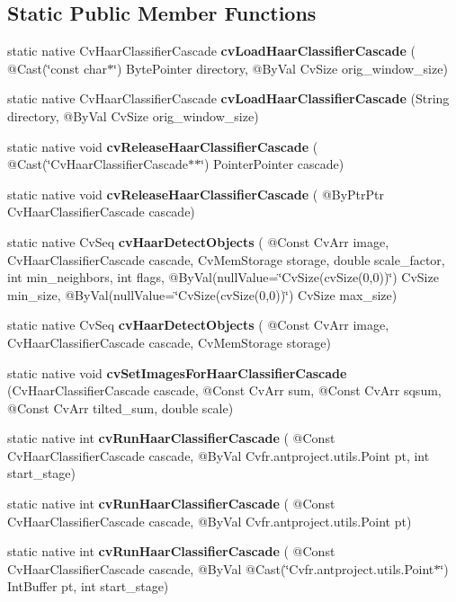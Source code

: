 \subsection*{Static Public Member Functions}
\begin{DoxyCompactItemize}
\item 
static native Cv\+Haar\+Classifier\+Cascade {\bfseries cv\+Load\+Haar\+Classifier\+Cascade} ( @Cast(\char`\"{}const char$\ast$\char`\"{}) Byte\+Pointer directory, @By\+Val Cv\+Size orig\+\_\+window\+\_\+size)
\item 
static native Cv\+Haar\+Classifier\+Cascade {\bfseries cv\+Load\+Haar\+Classifier\+Cascade} (String directory, @By\+Val Cv\+Size orig\+\_\+window\+\_\+size)
\item 
static native void {\bfseries cv\+Release\+Haar\+Classifier\+Cascade} ( @Cast(\char`\"{}Cv\+Haar\+Classifier\+Cascade$\ast$$\ast$\char`\"{}) Pointer\+Pointer cascade)
\item 
static native void {\bfseries cv\+Release\+Haar\+Classifier\+Cascade} ( @By\+Ptr\+Ptr Cv\+Haar\+Classifier\+Cascade cascade)
\item 
static native Cv\+Seq {\bfseries cv\+Haar\+Detect\+Objects} ( @Const Cv\+Arr image, Cv\+Haar\+Classifier\+Cascade cascade, Cv\+Mem\+Storage storage, double scale\+\_\+factor, int min\+\_\+neighbors, int flags, @By\+Val(null\+Value=\char`\"{}Cv\+Size(cv\+Size(0,0))\char`\"{}) Cv\+Size min\+\_\+size, @By\+Val(null\+Value=\char`\"{}Cv\+Size(cv\+Size(0,0))\char`\"{}) Cv\+Size max\+\_\+size)
\item 
static native Cv\+Seq {\bfseries cv\+Haar\+Detect\+Objects} ( @Const Cv\+Arr image, Cv\+Haar\+Classifier\+Cascade cascade, Cv\+Mem\+Storage storage)
\item 
static native void {\bfseries cv\+Set\+Images\+For\+Haar\+Classifier\+Cascade} (Cv\+Haar\+Classifier\+Cascade cascade, @Const Cv\+Arr sum, @Const Cv\+Arr sqsum, @Const Cv\+Arr tilted\+\_\+sum, double scale)
\item 
static native int {\bfseries cv\+Run\+Haar\+Classifier\+Cascade} ( @Const Cv\+Haar\+Classifier\+Cascade cascade, @By\+Val Cv\+fr.antproject.utils.Point pt, int start\+\_\+stage)
\item 
static native int {\bfseries cv\+Run\+Haar\+Classifier\+Cascade} ( @Const Cv\+Haar\+Classifier\+Cascade cascade, @By\+Val Cv\+fr.antproject.utils.Point pt)
\item 
static native int {\bfseries cv\+Run\+Haar\+Classifier\+Cascade} ( @Const Cv\+Haar\+Classifier\+Cascade cascade, @By\+Val @Cast(\char`\"{}Cv\+fr.antproject.utils.Point$\ast$\char`\"{}) Int\+Buffer pt, int start\+\_\+stage)
$$
\end{DoxyCompactItemize}
